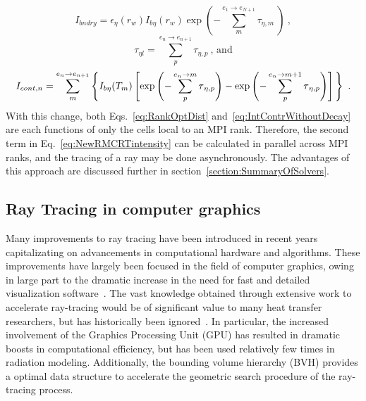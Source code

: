 \begin{equation}
    I_{bndry}=\epsilon{}_\eta{}(r_w)I_{b\eta{}}(r_w)\exp{\left(-\sum_{m}^{e_1\rightarrow{}e_{N+1}}\tau{}_{\eta{},m}~\right)}~,
    \label{eq:Ibndry}
\end{equation}
\begin{equation}
    \tau{}_{\eta{}l}=\sum_{p}^{e_n\rightarrow{}e_{n+1}}\tau{}_{\eta{},p}~\text{, and}
    \label{eq:RankOptDist}
\end{equation}
\begin{equation}
    I_{cont,n}=\sum_{m}^{e_n\rightarrow{}e_{n+1}}\left\{ I_{b\eta}(T_m)\left[ \exp{\left(-\sum_{p}^{e_n\rightarrow{}m}\tau{}_{\eta,p}\right)}
    -\exp{\left(-\sum_{p}^{e_n\rightarrow{}m+1}\tau{}_{\eta{},p}\right)} \vphantom{\frac12}\right] \vphantom{\frac12}\right\}~.
    \label{eq:IntContrWithoutDecay}
\end{equation}
With this change, both Eqs.~\ref{eq:RankOptDist} and~\ref{eq:IntContrWithoutDecay} are each functions of only the cells local to an MPI rank. Therefore, the second term in Eq.~\ref{eq:NewRMCRTintensity} can be calculated in parallel across MPI ranks, and the tracing of a ray may be done asynchronously. The advantages of this approach are discussed further in section~\ref{section:SummaryOfSolvers}.


\subsection{Ray Tracing in computer graphics}\label{section:ComputerGraphicsTracing}
Many improvements to ray tracing have been introduced in recent years capitalizating on advancements in computational hardware and algorithms.
These improvements have largely been focused in the field of computer graphics, owing in large part to the dramatic increase in the need for fast and detailed visualization software~\cite{Gupta2020CUDAComputing}. 
The vast knowledge obtained through extensive work to accelerate ray-tracing would be of significant value to many heat transfer researchers, but has historically been ignored~\cite{Howell2021TheTransfer}. 
In particular, the increased involvement of the Graphics Processing Unit (GPU) has resulted in dramatic boosts in computational efficiency, but has been used relatively few times in radiation modeling.
Additionally, the bounding volume hierarchy (BVH) provides a optimal data structure to accelerate the geometric search procedure of the ray-tracing process.

